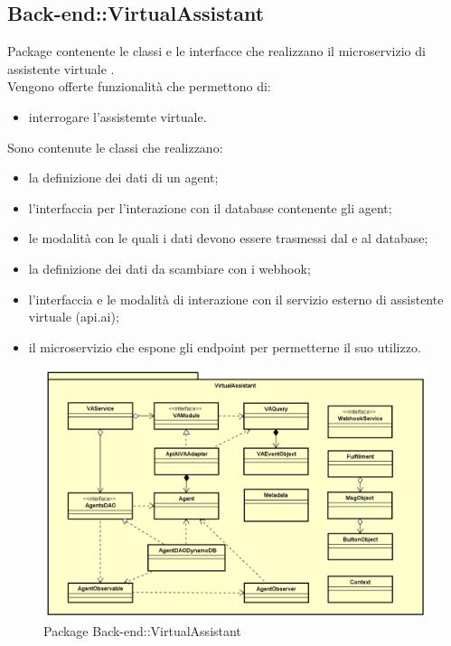 \subsection{Back-end::VirtualAssistant}
Package contenente le classi e le interfacce che realizzano il microservizio di assistente virtuale .\\ Vengono offerte funzionalità che permettono di: \begin{itemize} \item interrogare l'assistemte virtuale. \end{itemize} Sono contenute le classi che realizzano: \begin{itemize} \item la definizione dei dati di un agent; \item l'interfaccia per l'interazione con il database contenente gli agent; \item le modalità con le quali i dati devono essere trasmessi dal e al database; \item la definizione dei dati da scambiare con i webhook; \item l'interfaccia e le modalità di interazione con il servizio esterno di assistente virtuale (api.ai); \item il microservizio che espone gli endpoint per permetterne il suo utilizzo. \end{itemize}
\begin{figure}[h] \centering \includegraphics[width=\textwidth,height=\textheight,keepaspectratio]{images/diagrams/back-end/Official_Backend_0304/VirtualAssistant.png}
	\caption{Package Back-end::VirtualAssistant}
\end{figure}
\newpage

